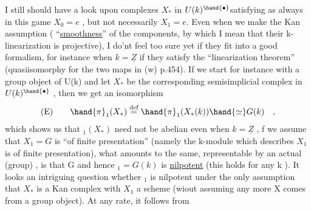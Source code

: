I still should have a look upon complexes $X_*$ in $U(k)^\hand{\bullet}$\hand{/}satisfying
\hand{(}as always in this game\hand{)} $X_0=e$ , but not necessarily $X_1 = e$. Even when
we make the Kan assumption ( ``\uline{smoothness}'' of the components,
by which I mean that their k-linearization is projective), I do'nt feel
too sure yet if they fit into a good formalism, for instance \hand{(}when $k=\underline{Z}$\hand{)}
if they satisfy the ``linearization theorem'' (quasiisomorphy for the two
maps in (w) p.454). If we start for instance with a group object of U(k)
and let $X_*$ be the corresponding semisimplicial complex in $U(k)^\hand{\bullet}$ , then
we get an isomorphism
\[ \text{(E)} \qquad \hand{\pi}_1(X_*) \overset{\text{def}}{=} \hand{\pi}_1(X_*(k)) \hand{\simeq} G(k) \quad , \]
which shows us that \hand{$\pi$}$_1(X_*)$ need not be abelian even when $k=\underline{Z}$ , 
 f we assume that $X_1 = G$ is ``of finite presentation''
(namely the  k-module which describes $X_1$ is of finite presentation), 
what amounts to the same, representable by an actual (group) , 
is  that G and hence \hand{$\pi$}$_1 = G(k)$ is \uline{nilpotent} (this holds for any k ).
It looks an intriguing question whether \hand{$\pi$}$_1$ is nilpotent under the only
assumption that $X_*$ is a  Kan complex with $X_1$ a scheme (wiout assuming
any more X comes from a group object). At any rate, it follows from


